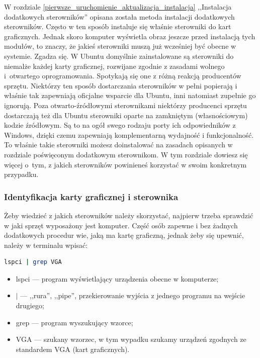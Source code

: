 \label{sterowniki}
W rozdziale \ref{pierwsze_uruchomienie_aktualizacja_instalacja} ,,Instalacja dodatkowych sterowników'' opisana została metoda instalacji dodatkowych sterowników. Często w ten sposób instaluje się właśnie sterowniki do kart graficznych. Jednak skoro komputer wyświetla obraz jeszcze przed instalacją tych modułów, to znaczy, że jakieś sterowniki muszą już wcześniej być obecne w systemie. Zgadza się. W Ubuntu domyślnie zainstalowane są sterowniki do niemalże każdej karty graficznej, rozwijane zgodnie z zasadami wolnego i~otwartego oprogramowania. Spotykają się one z różną reakcją producentów sprzętu. Niektórzy ten sposób dostarczania sterowników w pełni popierają i właśnie tak zapewniają oficjalne wsparcie dla Ubuntu, inni natomiast zupełnie go ignorują. Poza otwarto-źródłowymi sterownikami niektórzy producenci sprzętu dostarczają też dla Ubuntu sterowniki oparte na zamkniętym (własnościowym) kodzie źródłowym. Są to na ogół swego rodzaju porty ich odpowiedników z Windows, dzięki czemu zapewniają komplementarną wydajność i funkcjonalność. To właśnie takie sterowniki możesz doinstalować na zasadach opisanych w rozdziale poświęconym dodatkowym sterownikom. W tym rozdziale dowiesz się więcej o~tym, z jakich sterowników powinieneś korzystać w swoim konkretnym przypadku.

\subsubsection{Identyfikacja karty graficznej i sterownika}
Żeby wiedzieć z jakich sterowników należy skorzystać, najpierw trzeba sprawdzić w jaki sprzęt wyposażony jest komputer. Część osób zapewne i bez żadnych dodatkowych procedur wie, jaką ma kartę graficzną, jednak żeby się upewnić, należy w terminalu wpisać:

\begin{lstlisting}[language=bash]
lspci | grep VGA
\end{lstlisting}
\begin{itemize}
\item \textcolor{ubuntu_orange}{lspci} --- program wyświetlający urządzenia obecne w komputerze;
\item \textcolor{ubuntu_orange}{$|$} --- ,,rura'', ,,pipe'', przekierowanie wyjścia z jednego programu na wejście drugiego;
\item \textcolor{ubuntu_orange}{grep} --- program wyszukujący wzorce;
\item \textcolor{ubuntu_orange}{VGA} --- szukany wzorzec, w tym wypadku szukamy urządzeń zgodnych ze standardem VGA (kart graficznych).
\end{itemize}

